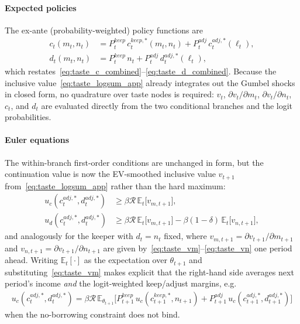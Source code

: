\paragraph{Expected policies}
The ex-ante (probability-weighted) policy functions are
\begin{align}
	c_t(m_t,n_t) &= P_t^{keep}\, c_t^{keep,\ast}(m_t,n_t) + P_t^{adj}\, c_t^{adj,\ast}(\ell_t), \label{eq:taste_c_app}\\
	d_t(m_t,n_t) &= P_t^{keep}\, n_t + P_t^{adj}\, d_t^{adj,\ast}(\ell_t), \label{eq:taste_d_app}
\end{align}
which restates~\eqref{eq:taste_c_combined}--\eqref{eq:taste_d_combined}. Because the inclusive value~\eqref{eq:taste_logsum_app} already integrates out the Gumbel shocks in closed form, no quadrature over taste nodes is required: $v_t$, $\partial v_t/\partial m_t$, $\partial v_t/\partial n_t$, $c_t$, and $d_t$ are evaluated directly from the two conditional branches and the logit probabilities.

\paragraph{Euler equations}
The within-branch first-order conditions are unchanged in form, but the continuation value is now the EV-smoothed inclusive value $v_{t+1}$ from~\eqref{eq:taste_logsum_app} rather than the hard maximum:
\begin{align}
	u_c(c_t^{adj,\ast},d_t^{adj,\ast}) &\ge \beta \mathcal{R}\, \mathbb{E}_t\big[v_{m,t+1}\big], \\
	u_d(c_t^{adj,\ast},d_t^{adj,\ast}) &\ge \beta \mathcal{R}\, \mathbb{E}_t\big[v_{m,t+1}\big] - \beta(1-\delta)\,\mathbb{E}_t\big[v_{n,t+1}\big],
\end{align}
and analogously for the keeper with $d_t = n_t$ fixed, where $v_{m,t+1}=\partial v_{t+1}/\partial m_{t+1}$ and $v_{n,t+1}=\partial v_{t+1}/\partial n_{t+1}$ are given by~\eqref{eq:taste_vm}--\eqref{eq:taste_vn} one period ahead. Writing $\mathbb{E}_t[\cdot]$ as the expectation over $\theta_{t+1}$ and substituting~\eqref{eq:taste_vm} makes explicit that the right-hand side averages next period's income \emph{and} the logit-weighted keep/adjust margins, e.g.
\begin{align}
	u_c(c_t^{adj,\ast},d_t^{adj,\ast}) = \beta \mathcal{R}\, \mathbb{E}_{\theta_{t+1}}\Big[
		P_{t+1}^{keep}\, u_c(c_{t+1}^{keep,\ast},n_{t+1})
		+ P_{t+1}^{adj}\, u_c(c_{t+1}^{adj,\ast},d_{t+1}^{adj,\ast})
	\Big]
\end{align}
when the no-borrowing constraint does not bind.


